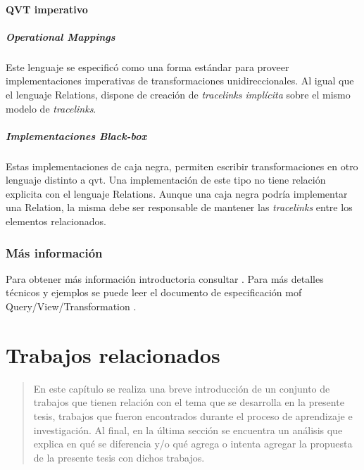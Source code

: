 \documentclass[a4paper,12pt,twoside,spanish,openright]{book}
\begin{document}
\subsubsection{QVT imperativo}


\paragraph{Operational Mappings}

Este lenguaje se especificó como una forma estándar para proveer implementaciones imperativas de transformaciones unidireccionales. Al igual que el lenguaje \textsf{Relations}, dispone de creación de \textit{tracelinks implícita} sobre el mismo modelo de \textit{tracelinks}.


\paragraph{Implementaciones Black-box}

Estas implementaciones de caja negra, permiten escribir transformaciones en otro lenguaje distinto a \gls{qvt}. Una implementación de este tipo no tiene relación explicita con el lenguaje \textsf{Relations}. Aunque una caja negra podría implementar una \textsf{Relation}, la misma debe ser responsable de mantener las \textit{tracelinks} entre los elementos relacionados.


\subsection{Más información}

Para obtener más información introductoria consultar \cite{DSDPM}. Para más detalles técnicos y ejemplos se puede leer el documento de especificación \gls{mof} Query/View/Transformation \cite{QVT}.




\chapter{Trabajos relacionados}

\begin{quotation}
En este capítulo se realiza una breve introducción de un conjunto de trabajos que tienen relación con el tema que se desarrolla en la presente tesis, trabajos que fueron encontrados durante el proceso de aprendizaje e investigación. Al final, en la última sección se encuentra un análisis que explica en qué se diferencia y/o qué agrega o intenta agregar la propuesta de la presente tesis con dichos trabajos.
\end{quotation}
\end{document}
